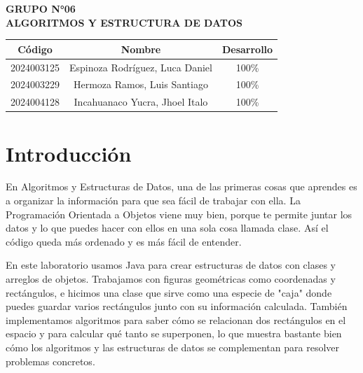 \documentclass[12pt]{article}
\newcommand{\curso}{Algoritmos y Estructura de Datos}
\newcommand{\Ngrupo}{06}
\begin{document}
\setlength{\headheight}{15pt} %


\begin{center}
{\large\textbf{GRUPO N°\Ngrupo}} \\
{\large\textbf{\MakeTextUppercase{\curso}}} \\
\end{center}
\begin{table}[h]
    \centering
    \begin{tabular}{|c|c|c|}
        \hline
        \textbf{Código} & \textbf{Nombre} & \textbf{Desarrollo} \\ \hline
      2024003125 & Espinoza Rodríguez, Luca Daniel & 100\% \\ \hline
      2024003229 & Hermoza Ramos, Luis Santiago & 100\% \\ \hline
      2024004128 & Incahuanaco Yucra, Jhoel Italo & 100\% \\ \hline
      
    \end{tabular}
\end{table}


\newpage
\renewcommand{\contentsname}{Índice de Contenidos}
\tableofcontents



\newpage


\section{Introducción}
En Algoritmos y Estructuras de Datos, una de las primeras cosas que
aprendes es a organizar la información para que sea fácil de trabajar
con ella. La Programación Orientada a Objetos viene muy
bien, porque te permite juntar los datos y lo que puedes hacer con
ellos en una sola cosa llamada clase. Así el código queda más ordenado
y es más fácil de entender.

\noindent En este laboratorio usamos Java para
crear estructuras de datos con clases y arreglos de
objetos. Trabajamos con figuras geométricas como coordenadas y
rectángulos, e hicimos una clase que sirve como una especie de "caja"
donde puedes guardar varios rectángulos junto con su información
calculada. También implementamos algoritmos para saber cómo se
relacionan dos rectángulos en el espacio y para calcular qué tanto se
superponen, lo que muestra bastante bien cómo los algoritmos y las
estructuras de datos se complementan para resolver problemas
concretos.
\end{document}
